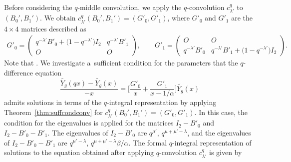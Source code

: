 \documentclass[pdftex]{sigma}
\numberwithin{equation}{section}
\theoremstyle{definition}
\begin{document}
Before considering the $q$-middle convolution, we apply the $q$-convolution $c^q_{\lambda'}$ to $(B_0', B_1')$.
We obtain $c^q_{\lambda'} (B_0', B_1')= (G'_0, G'_1)$, where $G'_0$ and $G'_1$ are the $4 \times 4$ matrices described as
\begin{gather*}
 G'_0
= \begin{pmatrix}
 q^{-\lambda'}B'_0 + \bigl(1 - q^{-\lambda'}\bigr)I_2 & q^{-\lambda'}B'_1 \\
 O & O
\end{pmatrix},\qquad
G'_1
= \begin{pmatrix}
 O & O \\
 q^{-\lambda'}B'_0 & q^{-\lambda'}B'_1 + \bigl(1-q^{-\lambda'}\bigr) I_2
\end{pmatrix}.
\end{gather*}
Note that .
We investigate a~sufficient condition for the parameters that the $q$-difference equation
\begin{equation} \label{eq:G'0G'1m}
\frac{\widetilde{Y_g}(qx) - \widetilde{Y_g}(x)}{-x} = \bigg[ \frac{G'_0}{x} + \frac{G'_1}{x-1/\alpha} \bigg] \widetilde{Y_g} (x)
\end{equation}
admits solutions in terms of the $q$-integral representation by applying Theorem~\ref{thm:suffcondconv} for $c^q_{\lambda'} (B_0', B_1')\allowbreak= (G'_0, G'_1)$.
In this case, the condition for the eigenvalues is applied for the matrices $I_2 - B'_0 $ and~${I_2 - B'_0 - B'_1 }$.
The eigenvalues of $I_2 - B'_0 $ are $ q^{\mu'}$, $ q^{\mu+\mu'-\lambda} $, and the eigenvalues of $I_2 - B'_0 - B'_1 $ are $ q^{\mu' - \lambda }$, $ q^{\mu+\mu'-\lambda} \beta/ \alpha $.
The formal $q$-integral representation of solutions to the equation obtained after applying $q$-convolution $c_{\lambda'}^q$ is given by
\end{document}
